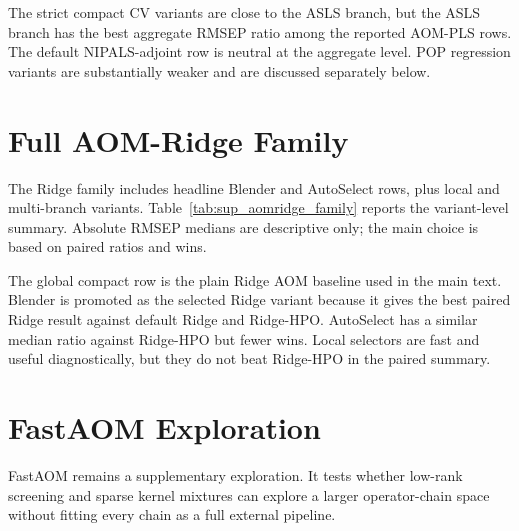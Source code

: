 \documentclass[11pt,a4paper]{article}
\begin{document}
\begin{table}[h]
\centering
\caption{AOM-PLS family summary from the seeds012 run.}
\label{tab:sup_aompls_family}
\small

\end{table}

The strict compact CV variants are close to the ASLS branch, but the ASLS
branch has the best aggregate RMSEP ratio among the reported AOM-PLS rows.
The default NIPALS-adjoint row is neutral at the aggregate level.  POP
regression variants are substantially weaker and are discussed separately
below.

\section{Full AOM-Ridge Family}

The Ridge family includes headline Blender and AutoSelect rows, plus local
and multi-branch variants.  Table~\ref{tab:sup_aomridge_family} reports the
variant-level summary.  Absolute RMSEP medians are descriptive only; the main
choice is based on paired ratios and wins.

\begin{table}[h]
\centering
\caption{AOM-Ridge family summary.}
\label{tab:sup_aomridge_family}
\small

\end{table}

The global compact row is the plain Ridge AOM baseline used in the main text.
Blender is promoted as the selected Ridge variant because it gives the best
paired Ridge result against default Ridge and Ridge-HPO.  AutoSelect has a
similar median ratio against Ridge-HPO but fewer wins.  Local selectors are
fast and useful diagnostically, but they do not beat Ridge-HPO in the paired
summary.

\section{FastAOM Exploration}

FastAOM remains a supplementary exploration.  It tests whether low-rank
screening and sparse kernel mixtures can explore a larger operator-chain
space without fitting every chain as a full external pipeline.

\begin{table}[h]
\centering
\caption{FastAOM wide seed0 summary.  Each row reports its own available
complete datasets and is not the main $N_{\cap}=32$ paired denominator.}
\label{tab:sup_fastaom_variants}
\small

\end{table}
\end{document}
